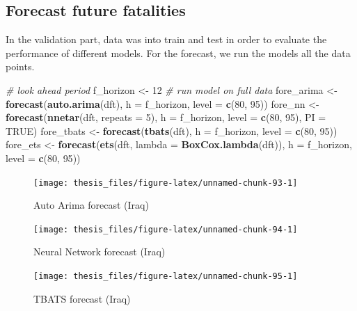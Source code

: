 \documentclass[11pt,oneside,a4paper]{reedthesis}
\newenvironment{Shaded}{\begin{snugshade}}{\end{snugshade}}
\newcommand{\KeywordTok}[1]{\textcolor[rgb]{0.13,0.29,0.53}{\textbf{#1}}}
\newcommand{\DataTypeTok}[1]{\textcolor[rgb]{0.13,0.29,0.53}{#1}}
\newcommand{\DecValTok}[1]{\textcolor[rgb]{0.00,0.00,0.81}{#1}}
\newcommand{\StringTok}[1]{\textcolor[rgb]{0.31,0.60,0.02}{#1}}
\newcommand{\CommentTok}[1]{\textcolor[rgb]{0.56,0.35,0.01}{\textit{#1}}}
\newcommand{\OtherTok}[1]{\textcolor[rgb]{0.56,0.35,0.01}{#1}}
\newcommand{\NormalTok}[1]{#1}
\begin{document}
\subsection{Forecast future
fatalities}\label{forecast-future-fatalities}

In the validation part, data was into train and test in order to
evaluate the performance of different models. For the forecast, we run
the models all the data points.
\begin{Shaded}
\begin{Highlighting}[]
\CommentTok{# look ahead period }
\NormalTok{f_horizon <-}\StringTok{ }\DecValTok{12}
\CommentTok{# run model on full data}
\NormalTok{fore_arima <-}\StringTok{ }\KeywordTok{forecast}\NormalTok{(}\KeywordTok{auto.arima}\NormalTok{(dft), }\DataTypeTok{h =}\NormalTok{ f_horizon, }\DataTypeTok{level =} \KeywordTok{c}\NormalTok{(}\DecValTok{80}\NormalTok{, }\DecValTok{95}\NormalTok{))}
\NormalTok{fore_nn <-}\StringTok{ }\KeywordTok{forecast}\NormalTok{(}\KeywordTok{nnetar}\NormalTok{(dft, }\DataTypeTok{repeats =} \DecValTok{5}\NormalTok{), }\DataTypeTok{h =}\NormalTok{ f_horizon, }
                    \DataTypeTok{level =} \KeywordTok{c}\NormalTok{(}\DecValTok{80}\NormalTok{, }\DecValTok{95}\NormalTok{), }\DataTypeTok{PI =} \OtherTok{TRUE}\NormalTok{)}
\NormalTok{fore_tbats <-}\StringTok{ }\KeywordTok{forecast}\NormalTok{(}\KeywordTok{tbats}\NormalTok{(dft), }\DataTypeTok{h =}\NormalTok{ f_horizon, }\DataTypeTok{level =} \KeywordTok{c}\NormalTok{(}\DecValTok{80}\NormalTok{, }\DecValTok{95}\NormalTok{))}
\NormalTok{fore_ets <-}\StringTok{ }\KeywordTok{forecast}\NormalTok{(}\KeywordTok{ets}\NormalTok{(dft, }\DataTypeTok{lambda =} \KeywordTok{BoxCox.lambda}\NormalTok{(dft)), }
                     \DataTypeTok{h =}\NormalTok{ f_horizon, }\DataTypeTok{level =} \KeywordTok{c}\NormalTok{(}\DecValTok{80}\NormalTok{, }\DecValTok{95}\NormalTok{))}
\end{Highlighting}
\end{Shaded}
\begin{figure}
\texttt{[image: thesis\_files/figure-latex/unnamed-chunk-93-1]} \caption{Auto Arima forecast (Iraq)}\label{fig:unnamed-chunk-93}
\end{figure}
\begin{figure}
\texttt{[image: thesis\_files/figure-latex/unnamed-chunk-94-1]} \caption{Neural Network forecast (Iraq)}\label{fig:unnamed-chunk-94}
\end{figure}
\begin{figure}
\texttt{[image: thesis\_files/figure-latex/unnamed-chunk-95-1]} \caption{TBATS forecast (Iraq)}\label{fig:unnamed-chunk-95}
\end{figure}
\end{document}
